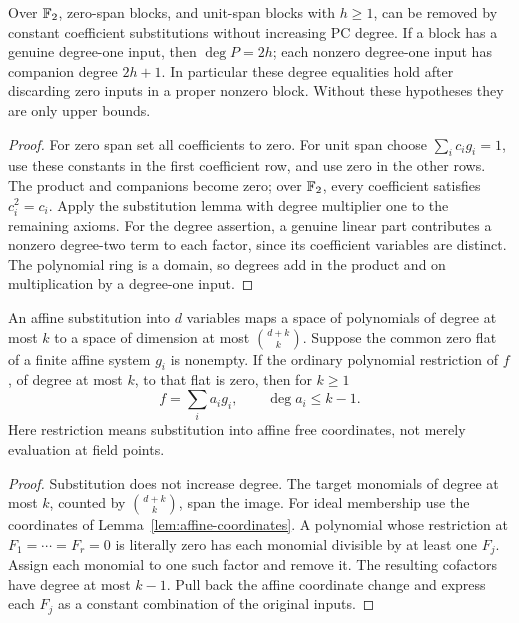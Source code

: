 \begin{lemma}\label{lem:cleanup}
Over \(\mathbb F_2\), zero-span blocks, and unit-span blocks with \(h\ge1\), can
be removed by constant coefficient substitutions without increasing PC degree.
If a block has a genuine degree-one input, then
\(\deg P=2h\); each nonzero degree-one input has companion degree \(2h+1\).
In particular these degree equalities hold after discarding zero inputs in
a proper nonzero block. Without these hypotheses they are only upper bounds.
\end{lemma}
\begin{proof}
For zero span set all coefficients to zero. For unit span choose
\(\sum_i c_i g_i=1\), use these constants in the first coefficient row,
and use zero in the other rows. The product and companions become zero;
over \(\mathbb F_2\), every coefficient satisfies \(c_i^2=c_i\).
Apply the substitution lemma with degree multiplier one to the remaining
axioms. For the degree assertion, a genuine linear part contributes a
nonzero degree-two term to each factor, since its coefficient variables
are distinct. The polynomial ring is a domain, so degrees add in the
product and on multiplication by a degree-one input.
\end{proof}

\begin{lemma}
\label{lem:restriction-ideal}
An affine substitution into \(d\) variables maps a space
of polynomials of degree at most \(k\) to a space of dimension at most
\(\binom{d+k}{k}\). Suppose the common zero flat of a finite affine
system \(g_i\) is nonempty. If the ordinary polynomial restriction of
\(f\), of degree at most \(k\), to that flat is zero, then for \(k\ge1\)
\begin{equation}\label{eq:literal-ideal}
 f=\sum_i a_i g_i,\qquad \deg a_i\le k-1.
\end{equation}
Here restriction means substitution into affine free coordinates, not
merely evaluation at field points.
\end{lemma}
\begin{proof}
Substitution does not increase degree. The target monomials of degree at
most \(k\), counted by \(\binom{d+k}{k}\), span the image.
For ideal membership use the coordinates of Lemma~\ref{lem:affine-coordinates}.
A polynomial whose restriction at \(F_1=\cdots=F_r=0\) is literally zero
has each monomial divisible by at least one \(F_j\). Assign each monomial
to one such factor and remove it. The resulting cofactors have degree at
most \(k-1\). Pull back the affine coordinate change and express each
\(F_j\) as a constant combination of the original inputs.
\end{proof}

